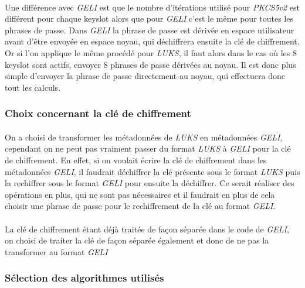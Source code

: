 \paragraph{}
Une différence avec {\em GELI} est que le nombre d'itérations utilisé pour 
{\em PKCS5v2} est différent pour chaque keyslot alors que pour {\em GELI} c'est
le même pour toutes les phrases de passe.
Dans {\em GELI} la phrase de passe est dérivée en espace utilisateur avant 
d'être envoyée en espace noyau, qui déchiffrera ensuite la clé de chiffrement.
Or si l'on applique le même procédé pour {\em LUKS}, il faut alors dans le cas
où les 8 keyslot sont actifs, envoyer 8 phrases de passe dérivées au noyau.
Il est donc plus simple d'envoyer la phrase de passe directement au noyau, qui
effectuera donc tout les calculs.

\subsubsection{Choix concernant la clé de chiffrement}
\paragraph{}
On a choisi de transformer les métadonnées de {\em LUKS} en métadonnées 
{\em GELI}, cependant on ne peut pas vraiment passer du format {\em LUKS} à 
{\em GELI} pour la clé de chiffrement. En effet, si on voulait écrire la clé 
de chiffrement dans les métadonnées {\em GELI}, il faudrait déchiffrer la clé 
présente sous le format {\em LUKS} puis la rechiffrer sous le format {\em GELI}
pour ensuite la déchiffrer. Ce serait réaliser des opérations en plus, qui ne 
sont pas nécessaires et il faudrait en plus de cela choisir une phrase de passe
pour le rechiffrement de la clé au format {\em GELI}. 

\paragraph{}
La clé de chiffrement étant déjà traitée de façon séparée dans le code de 
{\em GELI}, on choisi de traiter la clé de façon séparée également et donc de 
ne pas la transformer au format {\em GELI}


\subsubsection{Sélection des algorithmes utilisés}
